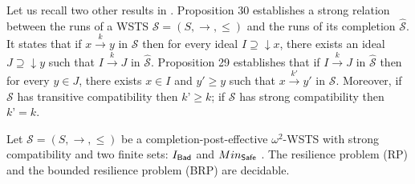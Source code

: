 Let us recall two other results in \cite{BFM-ic17}. Proposition 30 establishes a strong relation between the runs of a WSTS $\mathscr{S}=(S,\rightarrow, \leq)$ and the runs of its completion $\hat{\mathscr{S}}$. It states that if $x \xrightarrow{k} y$ in $\mathscr{S}$ then for every ideal $I \supseteq \downarrow x$, there exists an ideal $J \supseteq \downarrow y$ such that $I \xrightarrow{k} J$ in $\hat{\mathscr{S}}$. Proposition 29 establishes that if $I \xrightarrow{k} J$ in $\hat{\mathscr{S}}$ then for every $y \in J$, there exists $x \in I$ and $y' \geq y$ such that $x \xrightarrow{k'} y'$ in $\mathscr{S}$. Moreover, if $\mathscr{S}$ has transitive compatibility then $k’ \geq k$; if $\mathscr{S}$ has strong compatibility then $k’ = k$.


\begin{theorem}\label{down-up}
Let $\mathscr{S}=(S,\rightarrow, \leq)$ be a completion-post-effective $\omega^2$-WSTS with strong compatibility and two finite sets: $I_{\textsf{Bad}}$ and $Min_{\textsf{Safe}}$ .
The resilience problem (RP) and the bounded resilience problem (BRP) are decidable.
\end{theorem}

